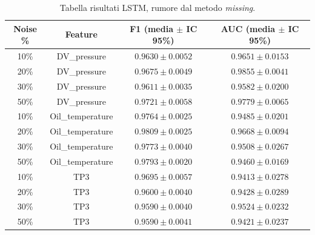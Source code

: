 \documentclass[../main.tex]{subfiles}
\begin{document}
\begin{table}[H]
\centering\small
{}
\begin{tabular}{cccc}
\toprule
\textbf{Noise \%} & \textbf{Feature} & \textbf{F1 (media $\pm$ IC 95\%)} & \textbf{AUC (media $\pm$ IC 95\%)} \\
\midrule
10\% & DV\_pressure     & $0.9630 \pm 0.0052$ & $0.9651 \pm 0.0153$ \\
20\% & DV\_pressure     & $0.9675 \pm 0.0049$ & $0.9855 \pm 0.0041$ \\
30\% & DV\_pressure     & $0.9611 \pm 0.0035$ & $0.9582 \pm 0.0200$ \\
50\% & DV\_pressure     & $0.9721 \pm 0.0058$ & $0.9779 \pm 0.0065$ \\
\midrule
10\% & Oil\_temperature & $0.9764 \pm 0.0025$ & $0.9485 \pm 0.0201$ \\
20\% & Oil\_temperature & $0.9809 \pm 0.0025$ & $0.9668 \pm 0.0094$ \\
30\% & Oil\_temperature & $0.9773 \pm 0.0040$ & $0.9508 \pm 0.0267$ \\
50\% & Oil\_temperature & $0.9793 \pm 0.0020$ & $0.9460 \pm 0.0169$ \\
\midrule
10\% & TP3             & $0.9695 \pm 0.0057$ & $0.9413 \pm 0.0278$ \\
20\% & TP3             & $0.9600 \pm 0.0040$ & $0.9428 \pm 0.0289$ \\
30\% & TP3             & $0.9590 \pm 0.0040$ & $0.9524 \pm 0.0232$ \\
50\% & TP3             & $0.9590 \pm 0.0041$ & $0.9421 \pm 0.0237$ \\
\bottomrule
\end{tabular}
\caption{Tabella risultati LSTM, rumore dal metodo \textit{missing}.}
\label{tab:lstm_missing}
\end{table}
\end{document}
